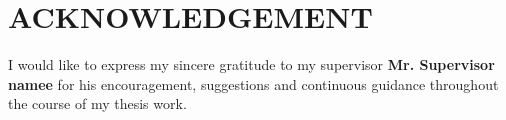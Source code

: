 \titlespacing{\chapter}{0pt}{0pt}{20pt}
\chapter*{ACKNOWLEDGEMENT}
I would like to express my sincere gratitude to my supervisor \textbf{Mr. Supervisor namee} for his encouragement, suggestions and continuous guidance throughout the course of my thesis work. 
\\ \\ \\



\newpage